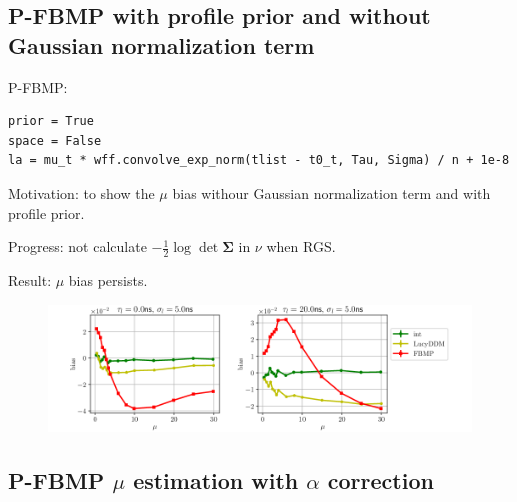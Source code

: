 \documentclass[notitlepage]{article}
\begin{document}
\subsection{P-FBMP \textbf{with} profile prior and \textbf{without} Gaussian normalization term}

P-FBMP:

\begin{lstlisting}
prior = True
space = False
la = mu_t * wff.convolve_exp_norm(tlist - t0_t, Tau, Sigma) / n + 1e-8
\end{lstlisting}

Motivation: to show the $\mu$ bias withour Gaussian normalization term and with profile prior. 

Progress: not calculate $-\frac{1}{2}\log\det\bm{\Sigma}$ in $\nu$ when RGS. 

Result: $\mu$ bias persists. 

\begin{figure}[H]
    \includegraphics[width=\textwidth]{vs-biasmu-profilepriorwospace.png}
\end{figure}

\subsection{P-FBMP $\mu$ estimation with $\alpha$ correction}
\end{document}
